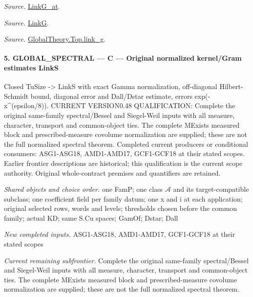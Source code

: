 \documentclass[11pt,a4paper]{article}
\numberwithin{equation}{section}
\theoremstyle{remark}\newtheorem{remark}[theorem]{Remark}
\begin{document}
\emph{Source.} \href{https://github.com/CocoSgt/riemann-hypothesis-lean/blob/7cbf7a0c32fca1badf05931879a37c3f8a2b03b4/src/Formalism/SharpRestriction/GlobalTheoremInputs.lean#L122-L137}{LinkG\_\allowbreak at}.

\emph{Source.} \href{https://github.com/CocoSgt/riemann-hypothesis-lean/blob/7cbf7a0c32fca1badf05931879a37c3f8a2b03b4/src/Formalism/SharpRestriction/GlobalTheoremInputs.lean#L138-L141}{LinkG}.

\emph{Source.} \href{https://github.com/CocoSgt/riemann-hypothesis-lean/blob/7cbf7a0c32fca1badf05931879a37c3f8a2b03b4/src/Development/AbelianVarietyTheory/Proofs/GlobalInterpolation/LinkG.lean#L14-L27}{GlobalTheory.Top.link\_\allowbreak g}.



\paragraph{5. GLOBAL\_\allowbreak SPECTRAL — C — Original normalized kernel/Gram estimates LinkS}

Closed TuSize -> LinkS with exact Gamma normalization, off-diagonal Hilbert-Schmidt bound, diagonal error and Dall/Dstar estimate, errors exp(-x\textasciicircum{}(epsilon/8)). CURRENT VERSION0.48 QUALIFICATION: Complete the original same-family spectral/Bessel and Siegel-Weil inputs with all measure, character, transport and common-object ties. The complete MExists measured block and prescribed-measure covolume normalization are supplied; these are not the full normalized spectral theorem. Completed current producers or conditional consumers: ASG1-ASG18, AMD1-AMD17, GCF1-GCF18 at their stated scopes. Earlier frontier descriptions are historical; this qualification is the current scope authority. Original whole-contract premises and quantifiers are retained.

\emph{Shared objects and choice order.} one FamP; one class $\mathcal A$ and its target-compatible subclass; one coefficient field per family datum; one x and i at each application; original selected rows, words and levels; thresholds chosen before the common family; actual KD; same S.Cu spaces; GamOf; Dstar; Dall

\emph{New completed inputs.} ASG1-ASG18, AMD1-AMD17, GCF1-GCF18 at their stated scopes

\emph{Current remaining subfrontier.} Complete the original same-family spectral/Bessel and Siegel-Weil inputs with all measure, character, transport and common-object ties. The complete MExists measured block and prescribed-measure covolume normalization are supplied; these are not the full normalized spectral theorem.
\end{document}
